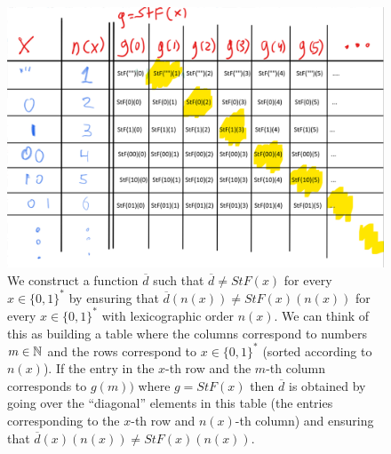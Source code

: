 \begin{figure}
\centering
\includegraphics[width=\textwidth, height=0.25\paperheight, keepaspectratio]{../figure/diagreals2.png}
\caption{We construct a function \(\overline{d}\) such that
\(\overline{d} \neq StF(x)\) for every \(x\in \{0,1\}^*\) by ensuring
that \(\overline{d}(n(x)) \neq StF(x)(n(x))\) for every
\(x\in \{0,1\}^*\) with lexicographic order \(n(x)\). We can think of
this as building a table where the columns correspond to numbers
\(m\in {\mathbb{N}}\) and the rows correspond to \(x\in \{0,1\}^*\) (sorted
according to \(n(x)\)). If the entry in the \(x\)-th row and the
\(m\)-th column corresponds to \(g(m))\) where \(g=StF(x)\) then
\(\overline{d}\) is obtained by going over the ``diagonal'' elements in
this table (the entries corresponding to the \(x\)-th row and
\(n(x)\)-th column) and ensuring that
\(\overline{d}(x)(n(x)) \neq StF(x)(n(x))\).}
\label{diagrealsfig}
\end{figure}

